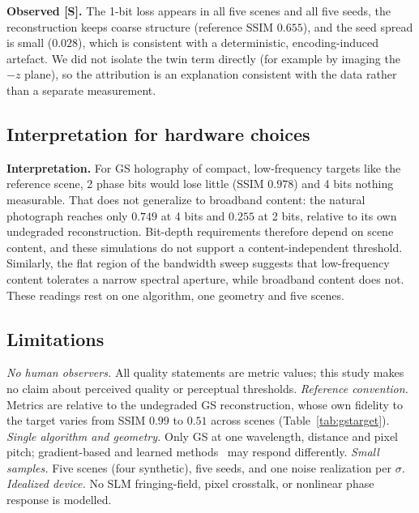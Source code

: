 \documentclass[conference]{IEEEtran}
\begin{document}
\textbf{Observed [S].} The 1-bit loss appears in all five scenes and all five
seeds, the reconstruction keeps coarse structure (reference SSIM $0.655$), and
the seed spread is small ($0.028$), which is consistent with a deterministic,
encoding-induced artefact. We did not isolate the twin term directly (for
example by imaging the $-z$ plane), so the attribution is an explanation
consistent with the data rather than a separate measurement.

\subsection{Interpretation for hardware choices}
\textbf{Interpretation.} For GS holography of compact, low-frequency targets
like the reference scene, 2 phase bits would lose little (SSIM $0.978$) and 4
bits nothing measurable. That does not generalize to broadband content: the
natural photograph reaches only $0.749$ at 4 bits and $0.255$ at 2 bits,
relative to its own undegraded reconstruction. Bit-depth requirements
therefore depend on scene content, and these simulations do not support a
content-independent threshold. Similarly, the flat region of the bandwidth
sweep suggests that low-frequency content tolerates a narrow spectral
aperture, while broadband content does not. These readings rest on one
algorithm, one geometry and five scenes.

\subsection{Limitations}
\textit{No human observers.} All quality statements are metric values; this
study makes no claim about perceived quality or perceptual thresholds.
\textit{Reference convention.} Metrics are relative to the undegraded GS
reconstruction, whose own fidelity to the target varies from SSIM $0.99$ to
$0.51$ across scenes (Table~\ref{tab:gstarget}).
\textit{Single algorithm and geometry.} Only GS at one wavelength, distance
and pixel pitch; gradient-based and learned
methods~\cite{chakravarthula2019wirtinger,shi2021towards,peng2020neural} may
respond differently.
\textit{Small samples.} Five scenes (four synthetic), five seeds, and one
noise realization per $\sigma$.
\textit{Idealized device.} No SLM fringing-field, pixel crosstalk, or
nonlinear phase response is modelled.

\end{document}
